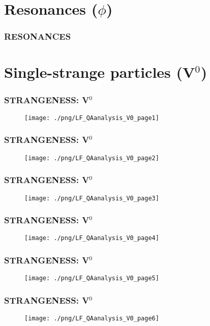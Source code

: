 \documentclass{beamer}
\begin{document}
\section{Resonances ($\phi$)}
\begin{frame}
\frametitle{RESONANCES}
\end{frame}


\section{Single-strange particles (V$^{0}$)} 
\begin{frame}
\frametitle{STRANGENESS: V$^{0}$}
  \begin{figure}
  \texttt{[image: ./png/LF\_QAanalysis\_V0\_page1]}
  \end{figure}
\end{frame}
\begin{frame}
\frametitle{STRANGENESS: V$^{0}$}
  \begin{figure}
  \texttt{[image: ./png/LF\_QAanalysis\_V0\_page2]}
  \end{figure}
\end{frame}
\begin{frame}
\frametitle{STRANGENESS: V$^{0}$}
  \begin{figure}
  \texttt{[image: ./png/LF\_QAanalysis\_V0\_page3]}
  \end{figure}
\end{frame}
\begin{frame}
\frametitle{STRANGENESS: V$^{0}$}
  \begin{figure}
  \texttt{[image: ./png/LF\_QAanalysis\_V0\_page4]}
  \end{figure}
\end{frame}
\begin{frame}
\frametitle{STRANGENESS: V$^{0}$}
  \begin{figure}
  \texttt{[image: ./png/LF\_QAanalysis\_V0\_page5]}
  \end{figure}
\end{frame}
\begin{frame}
\frametitle{STRANGENESS: V$^{0}$}
  \begin{figure}
  \texttt{[image: ./png/LF\_QAanalysis\_V0\_page6]}
  \end{figure}
\end{frame}
\end{document}
